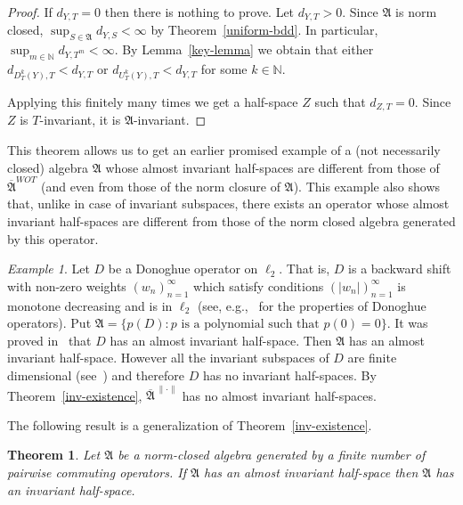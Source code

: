 \documentclass[12pt]{amsart}
\theoremstyle{plain}
\newtheorem{theorem}{Theorem}[section]
\theoremstyle{definition}
\theoremstyle{remark}
\newtheorem*{example}{Example}
\begin{document}
\begin{proof}
If $d_{Y,T}=0$ then there is nothing to prove. Let $d_{Y,T}>0$. Since $\mathfrak A$ is norm closed, $\sup_{S\in\mathfrak A}d_{Y,S}<\infty$ by Theorem~\ref{uniform-bdd}. In particular, $\sup_{m\in\mathbb N}d_{Y,T^m}<\infty$. By Lemma~\ref{key-lemma} we obtain that either $d_{D_T^k(Y),T}<d_{Y,T}$ or $d_{U_T^k(Y),T}<d_{Y,T}$ for some $k\in\mathbb N$. 

Applying this finitely many times we get a half-space $Z$ such that $d_{Z,T}=0$. Since $Z$ is $T$-invariant, it is $\mathfrak A$-invariant.
\end{proof}

This theorem allows us to get an earlier promised example of a (not necessarily closed) algebra $\mathfrak A$ whose almost invariant half-spaces are different from those of $\overline{\mathfrak A}^{WOT}$ (and even from those of the norm closure of $\mathfrak A$). This example also shows that, unlike in case of invariant subspaces, there exists an operator whose almost invariant half-spaces are different from those of the norm closed algebra generated by this operator.

\begin{example} Let $D$ be a Donoghue operator on $\ell_2$. That is, $D$ is a backward shift with non-zero weights $(w_n)_{n=1}^\infty$ which satisfy conditions $({\lvert{w_n}\rvert})_{n=1}^\infty$ is monotone decreasing and is in $\ell_2$ (see, e.g.,~\cite[Section 4.4]{RR03} for the properties of Donoghue operators). Put $\mathfrak A=\{p(D)\colon p\mbox{ is a polynomial such that }p(0)=0\}$. It was proved in~\cite{APTT} that $D$ has an almost invariant half-space. Then $\mathfrak A$ has an almost invariant half-space. However all the invariant subspaces of $D$ are finite dimensional (see~\cite[Theorem 4.12]{RR03}) and therefore $D$ has no invariant half-spaces.
By Theorem~\ref{inv-existence}, $\overline{\mathfrak A}^{\,{\lVert{\cdot}\rVert}}$ has no almost invariant half-spaces.
\end{example}

The following result is a generalization of Theorem~\ref{inv-existence}.

\begin{theorem}\label{inv-existence-ext} Let $\mathfrak A$ be a norm-closed algebra generated by a finite number of pairwise commuting operators. If $\mathfrak A$ has an almost invariant half-space then $\mathfrak A$ has an invariant half-space.
\end{theorem}
\end{document}
